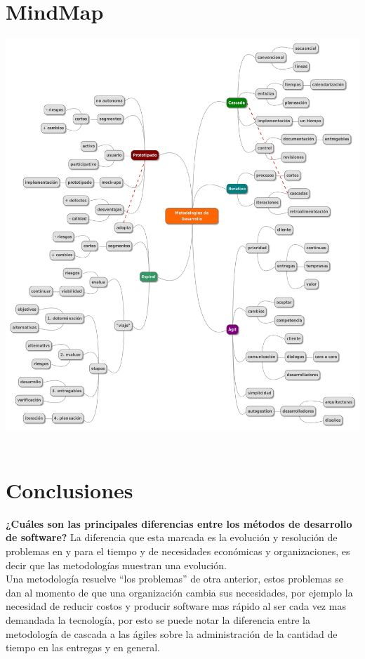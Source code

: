 \documentclass[spanish,12pt,letterpapper]{article}
\begin{document}
	\section{MindMap}
	\begin{center}
		\includegraphics[width=1\textwidth]{./mindmap}~\\[1cm] 
\end{center}		
		
	\section{Conclusiones}
	
    \textbf{¿Cuáles son las principales diferencias entre los métodos de desarrollo de software?}
    La diferencia que esta marcada es la evolución y resolución de problemas en y para el tiempo y de necesidades económicas y organizaciones, es decir que las metodologías muestran una evolución.\\
    
    Una metodología resuelve ``los problemas'' de otra anterior, estos problemas se dan al momento de que una organización cambia sus necesidades, por ejemplo la necesidad de reducir costos y producir software mas rápido al ser cada vez mas demandada la tecnología, por esto se puede notar la diferencia entre la metodología de cascada a las ágiles sobre la administración de la cantidad de tiempo en las entregas y en general.\\
    
\end{document}
